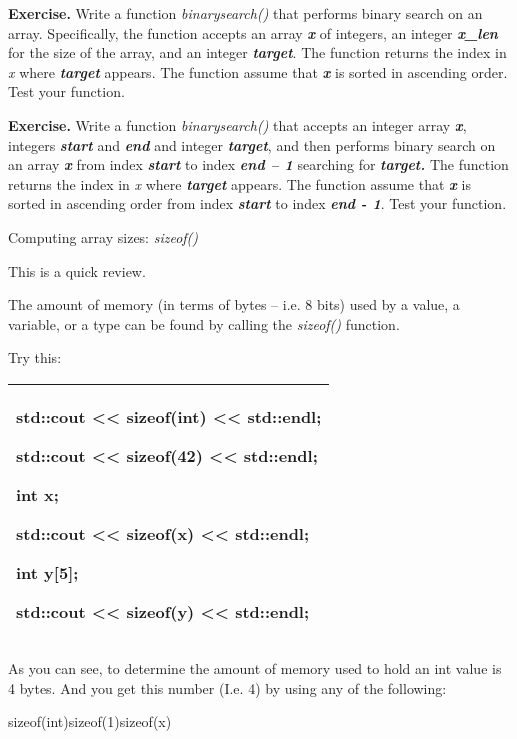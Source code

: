 \documentclass[
]{article}
\begin{document}
\textbf{Exercise.} Write a function \emph{binarysearch()} that performs
binary search on an array. Specifically, the function accepts an array
\emph{\textbf{x}} of integers, an integer \emph{\textbf{x\_len}} for the
size of the array, and an integer \emph{\textbf{target}}. The function
returns the index in \emph{x} where \emph{\textbf{target}} appears. The
function assume that \emph{\textbf{x}} is sorted in ascending order.
Test your function.

\textbf{Exercise.} Write a function \emph{binarysearch()} that accepts
an integer array \emph{\textbf{x}}, integers \emph{\textbf{start}} and
\emph{\textbf{end}} and integer \emph{\textbf{target}}, and then
performs binary search on an array \emph{\textbf{x}} from index
\emph{\textbf{start}} to index \emph{\textbf{end -- 1 }}searching for
\emph{\textbf{target. }}The function returns the index in \emph{x} where
\emph{\textbf{target}} appears. The function assume that
\emph{\textbf{x}} is sorted in ascending order from index
\emph{\textbf{start}} to index \emph{\textbf{end - 1}}. Test your
function.

Computing array sizes: \emph{sizeof()}

This is a quick review.

The amount of memory (in terms of bytes -- i.e. 8 bits) used by a value,
a variable, or a type can be found by calling the \emph{sizeof()}
function.

Try this:

\begin{longtable}[]{@{}l@{}}
\toprule
\endhead
\begin{minipage}[t]{0.97\columnwidth}\raggedright
std::cout \textless\textless{} sizeof(int) \textless\textless{}
std::endl;

std::cout \textless\textless{} sizeof(42) \textless\textless{}
std::endl;

int x;

std::cout \textless\textless{} sizeof(x) \textless\textless{} std::endl;

int y{[}5{]};

std::cout \textless\textless{} sizeof(y) \textless\textless{}
std::endl;\strut
\end{minipage}\tabularnewline
\bottomrule
\end{longtable}

As you can see, to determine the amount of memory used to hold an int
value is 4 bytes. And you get this number (I.e. 4) by using any of the
following:

sizeof(int)sizeof(1)sizeof(x)
\end{document}
